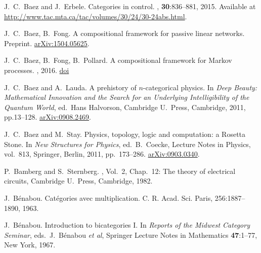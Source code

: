 \begin{thebibliography}{RSW00}
    J.\ C.\ Baez and J.\ Erbele.
    \newblock Categories in control. 
    , {\bf 30}:836--881,
    2015. 
    \newblock Available at
    \href{http://www.tac.mta.ca/tac/volumes/30/24/30-24abs.html}{http://www.tac.mta.ca/tac/volumes/30/24/30-24abs.html}.

    J.\ C.\ Baez, B.\ Fong. 
    \newblock A compositional framework for passive linear networks.
    \newblock Preprint. 
    \newblock \href{http://arxiv.org/abs/1504.05625}{arXiv:1504.05625}. 

    J.\ C.\ Baez, B.\ Fong, B.\ Pollard. 
    \newblock A compositional framework for Markov processes.
    , 2016.
    \newblock \href{doi}{doi}

    J.\ C.\ Baez and A.\ Lauda.
    \newblock A prehistory of $n$-categorical
    physics. 
    \newblock In {\em Deep Beauty: Mathematical Innovation and
    the Search for an Underlying Intelligibility of the Quantum World}, ed.\
    Hans Halvorson, Cambridge U.\ Press, Cambridge, 2011, pp.13--128.  
    \newblock \href{http://arxiv.org/abs/0908.2469}{arXiv:0908.2469}.

    J.\ C.\ Baez and M.\ Stay. 
    \newblock Physics, topology, logic and 
    computation: a Rosetta Stone. 
    \newblock In {\sl New Structures for Physics}, ed.\ B.\ Coecke,  
    Lecture Notes in Physics, vol.\ 813, Springer, Berlin, 2011, pp.\ 173--286.
    \newblock \href{http://arxiv.org/abs/0903.0340}{arXiv:0903.0340}.

    P.\ Bamberg and S.\ Sternberg. 
    , Vol.\ 2, Chap.\ 12: The theory of electrical circuits,
    Cambridge U.\ Press, Cambridge, 1982. 

    J.\ B\'enabou.
    \newblock Cat\'egories avec multiplication. 
    \newblock C. R. Acad. Sci. Paris, 256:1887–1890, 1963.

    J.\ B\'enabou.
    \newblock Introduction to bicategories I.
    \newblock In \textsl{Reports
    of the Midwest Category Seminar}, eds.\ J.\ B\'enabou \textit{et al},
    Springer Lecture Notes in Mathematics {\bf 47}:1--77, New York, 1967.



\end{thebibliography}
